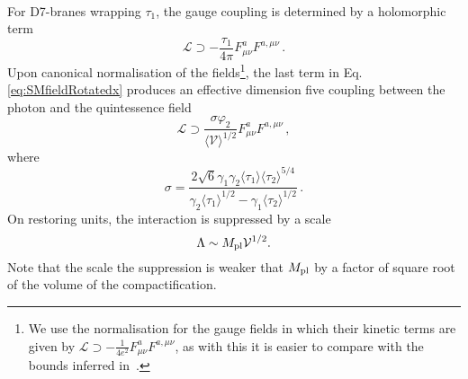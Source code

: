 \documentclass[11pt,a4paper]{article}
\newcommand{\be}{\begin{equation}}
\newcommand{\ee}{\end{equation}}
\newcommand{\V}{\mathcal{V}}
\begin{document}
%
\\
For D7-branes wrapping $\tau_1$, the gauge coupling is determined by a holomorphic term
%
\begin{equation}
\label{gc}
\mathcal{L} \supset - \frac{\tau_1}{4 \pi} F^a_{\mu \nu} F^{a, \mu \nu} \,.
\end{equation}
%
Upon canonical normalisation of the fields\footnote{We use the  normalisation for the gauge fields in which their kinetic terms are given by $\mathcal{L} \supset - \frac{1}{4 e^2} F^a_{\mu \nu} F^{a, \mu \nu}$, as with this it is easier to compare with the bounds inferred in~\cite{Damour:2010rp}. }, the last term in Eq. \eqref{eq:SMfieldRotatedx} produces an effective dimension five coupling between the photon and the quintessence field 
%
\begin{equation}
\mathcal{L} \supset \frac{\sigma \varphi_2}{\langle\V\rangle^{1/2} } F^a_{\mu \nu} F^{a, \mu \nu} \,,
\end{equation}
%
where
%
\begin{equation}
\label{eq:Sigma}
\sigma = \frac{2 \sqrt{6} \gamma_1 \gamma_2 \langle \tau_1 \rangle \langle \tau_2 \rangle^{5/4}}{\gamma_2 \langle \tau_1 \rangle^{1/2} - \gamma_1 \langle \tau_2 \rangle^{1/2}} \,.
\end{equation}
%
On restoring units, the interaction is suppressed by a scale 
%
\be
\label{supr}
  \Lambda \sim M_{\rm pl} \V^{1/2}.
\ee
%
Note that the scale the suppression is weaker that $M_{\rm pl}$ by a factor of square root of the volume of the compactification.



\vspace{0.3  cm}
\end{document}
